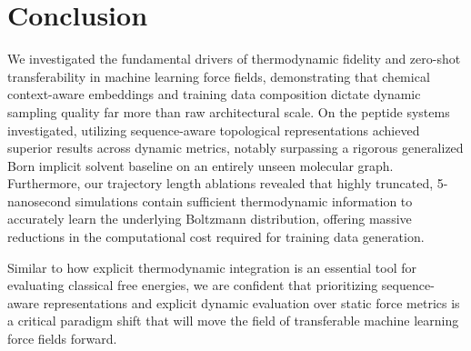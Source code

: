 \section{Conclusion}

We investigated the fundamental drivers of thermodynamic fidelity and zero-shot transferability in machine learning force fields, demonstrating that chemical context-aware embeddings and training data composition dictate dynamic sampling quality far more than raw architectural scale. On the peptide systems investigated, utilizing sequence-aware topological representations achieved superior results across dynamic metrics, notably surpassing a rigorous generalized Born implicit solvent baseline on an entirely unseen molecular graph. Furthermore, our trajectory length ablations revealed that highly truncated, 5-nanosecond simulations contain sufficient thermodynamic information to accurately learn the underlying Boltzmann distribution, offering massive reductions in the computational cost required for training data generation. 

Similar to how explicit thermodynamic integration is an essential tool for evaluating classical free energies, we are confident that prioritizing sequence-aware representations and explicit dynamic evaluation over static force metrics is a critical paradigm shift that will move the field of transferable machine learning force fields forward.
